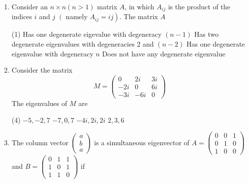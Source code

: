 \begin{enumerate}[label=\color{ocre}\textbf{\arabic*.}]
$$\begin{array}{ccc}
	n_{3} & 0 & -n_{1} \\
	-n_{2} & n_{1} & 0
	\end{array}\right)
	$$
	where $n_{1}, n_{2}$ and $n_{3}$ are the components of a unit vector, are
	{}
	\begin{tasks}(4)
		\task[\textbf{A.}] $0, i,-i$
		\task[\textbf{B.}] $0,1,-1$
		\task[\textbf{C.}] $0,1+i,-1,-i$
		\task[\textbf{D.}]  $0,0,0$
	\end{tasks}
	\item Consider an $n \times n(n>1)$ matrix $A$, in which $A_{i j}$ is the product of the indices $i$ and $j$ $\left(\right.$ namely $\left.A_{i j}=i j\right)$. The matrix $A$
	{}
	\begin{tasks}(1)
		\task[\textbf{A.}]  Has one degenerate eigevalue with degeneracy $(n-1)$
		\task[\textbf{B.}] Has two degenerate eigenvalues with degeneracies 2 and $(n-2)$
		\task[\textbf{C.}] Has one degenerate eigenvalue with degeneracy $n$
		\task[\textbf{D.}] Does not have any degenerate eigenvalue
	\end{tasks}
	\item Consider the matrix
	$$
	M=\left(\begin{array}{ccc}
	0 & 2 i & 3 i \\
	-2 i & 0 & 6 i \\
	-3 i & -6 i & 0
	\end{array}\right)
	$$
	The eigenvalues of $M$ are
	{}
	\begin{tasks}(4)
		\task[\textbf{A.}] $-5,-2,7$
		\task[\textbf{B.}] $-7,0,7$
		\task[\textbf{C.}] $-4 i, 2 i, 2 i$
		\task[\textbf{D.}] $2,3,6$
	\end{tasks}
	\item The column vector $\left(\begin{array}{l}a \\ b \\ a\end{array}\right)$ is a simultaneous eigenvector of $A=\left(\begin{array}{ccc}0 & 0 & 1 \\ 0 & 1 & 0 \\ 1 & 0 & 0\end{array}\right)$ and $B=\left(\begin{array}{lll}0 & 1 & 1 \\ 1 & 0 & 1 \\ 1 & 1 & 0\end{array}\right)$ if
	{}

\end{enumerate}
